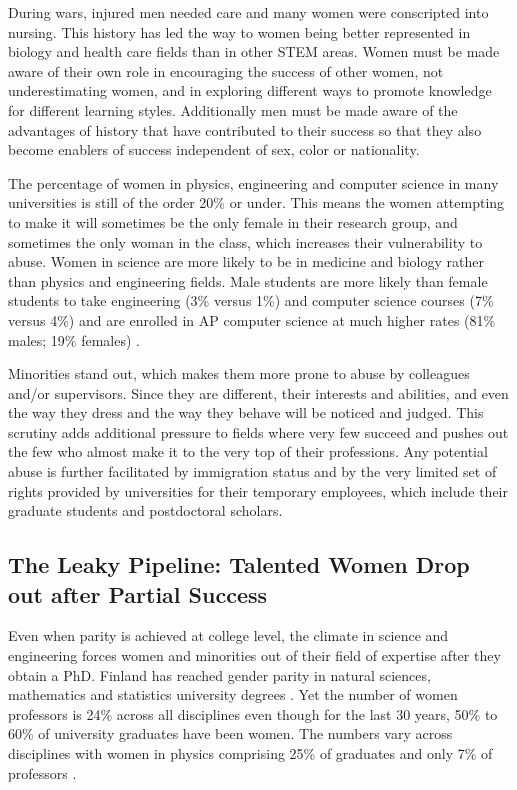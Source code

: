 \documentclass[utf8]{frontiersSCNS} %
\begin{document}
During wars, injured men needed care and many women were conscripted into nursing. This history has led the way to women being better represented in biology and health care fields than in other STEM areas. Women must be made aware of their own role in encouraging the success of other women, not underestimating women, and in exploring different ways to promote knowledge for different learning styles. Additionally men must be made aware of the advantages of history that have contributed to their success so that they also become enablers of success independent of sex, color or nationality.

The percentage of women in physics, engineering and computer science in many universities is still of the order 20\% or under. This means the women attempting to make it will sometimes be the only female in their research group, and sometimes the only woman in the class, which increases their vulnerability to abuse. Women in science are more likely to be in medicine and biology rather than physics and engineering fields. Male students are more likely than female students to take engineering (3\% versus 1\%) and computer science courses (7\% versus 4\%) and are enrolled in AP computer science at much higher rates (81\% males; 19\% females) \citep{NGC}. %

Minorities stand out, which makes them more prone to abuse by colleagues and/or supervisors. Since they are different, their interests and abilities, and even the way they dress and the way they behave will be noticed and judged. This scrutiny adds additional pressure to fields where very few succeed and pushes out the few who almost make it to the very top of their professions. Any potential abuse is further facilitated by immigration status and by the very limited set of rights provided by universities for their temporary employees, which include their graduate students and postdoctoral scholars. 

\subsection{The Leaky Pipeline: Talented Women Drop out after Partial Success}
\label{leaky}
Even when parity is achieved at college level, the climate in science and engineering forces women and minorities out of their field of expertise after they obtain a PhD. Finland has reached gender parity in natural sciences, mathematics and statistics university degrees \citep{FinlandStats}. Yet the number of women professors is 24\% across all disciplines even though for the last 30 years, 50\% to 60\% of university graduates have been women. The numbers vary across disciplines with women in physics comprising 25\% of graduates and only 7\% of professors \citep{banzuzi2013women}. 
\end{document}

